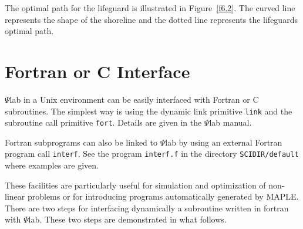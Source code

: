 	The optimal path for the lifeguard is illustrated in
Figure~\ref{f6.2}.  The curved line represents the shape of the
shoreline and the dotted line represents the lifeguards optimal
path.
%

%


\section{Fortran or C Interface}

 $\Psi$lab in a Unix environment can be easily interfaced with Fortran 
or C subroutines. 
The simplest way is using the dynamic link primitive 
{\tt link} and the subroutine
call primitive {\tt fort}. Details are
given in the $\Psi$lab manual.

Fortran subprograms can also be linked to $\Psi$lab by using an external 
Fortran program call {\tt interf}. See
the program {\tt interf.f} in the directory {\tt SCIDIR/default} where
examples are given.

These facilities are particularly useful
for simulation and optimization of non-linear problems or for
introducing programs automatically generated by MAPLE.  There are
two steps for interfacing dynamically a subroutine written 
in fortran with $\Psi$lab. 
These two steps are demonstrated in what follows.

